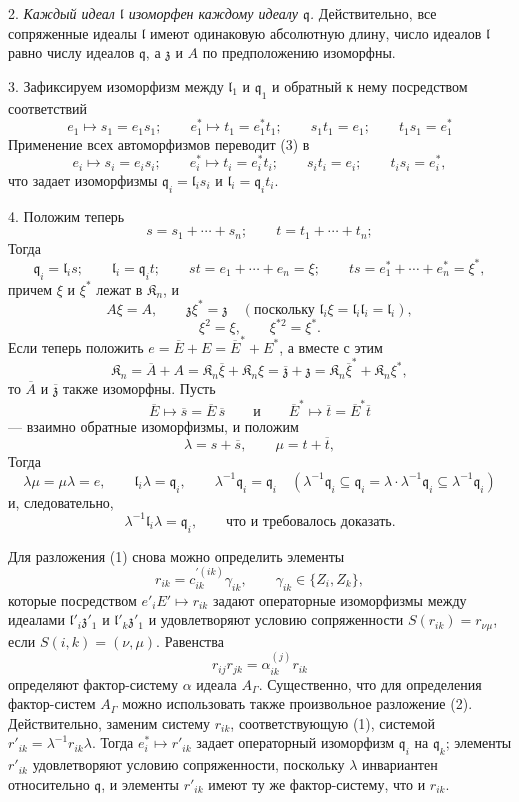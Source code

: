 \documentclass[11pt]{article}
\begin{document}
2. \emph{Каждый идеал \(\mathfrak l\) изоморфен каждому идеалу \(\mathfrak q\).} Действительно, все сопряженные идеалы \(\mathfrak l\) имеют одинаковую абсолютную длину, число идеалов \(\mathfrak l\) равно числу идеалов \(\mathfrak q\), а \(\mathfrak z\) и \(A\) по предположению изоморфны.

3. Зафиксируем изоморфизм между \(\mathfrak l_1\) и \(\mathfrak q_1\) и обратный к нему посредством соответствий
\[
\tag{3}
e_1\mapsto s_1=e_1s_1;\qquad
e_1^*\mapsto t_1=e_1^*t_1;\qquad
s_1t_1=e_1;\qquad
t_1s_1=e_1^*
\]
Применение всех автоморфизмов переводит (3) в
\[
e_i\mapsto s_i=e_is_i;\qquad
e_i^*\mapsto t_i=e_i^*t_i;\qquad
s_it_i=e_i;\qquad
t_is_i=e_i^*,
\]
что задает изоморфизмы \(\mathfrak q_i=\mathfrak l_is_i\) и \(\mathfrak l_i=\mathfrak q_it_i\).

4. Положим теперь
\[
s=s_1+\cdots+s_n;\qquad t=t_1+\cdots+t_n;
\]
Тогда
\[
\mathfrak q_i=\mathfrak l_is;\qquad
\mathfrak l_i=\mathfrak q_it;\qquad
st=e_1+\cdots+e_n=\xi;\qquad
ts=e_1^*+\cdots+e_n^*=\xi^*,
\]
причем \(\xi\) и \(\xi^*\) лежат в \(\mathfrak K_n\), и
\[
A\xi=A,\qquad \mathfrak z\xi^*=\mathfrak z\quad
(\text{поскольку }\mathfrak l_i\xi=\mathfrak l_i\mathfrak l_i=\mathfrak l_i),
\]
\[
\xi^2=\xi,\qquad \xi^{*2}=\xi^*.
\]
Если теперь положить \(e=\overline E+E=\overline E^*+E^*\), а вместе с этим
\[
\mathfrak K_n=\overline A+A
=\mathfrak K_n\overline\xi+\mathfrak K_n\xi
=\overline{\mathfrak z}+\mathfrak z
=\mathfrak K_n\overline\xi^*+\mathfrak K_n\xi^*,
\]
то \(\overline A\) и \(\overline{\mathfrak z}\) также изоморфны. Пусть
\[
\overline E\mapsto\overline s=\overline E\,\overline s
\qquad\text{и}\qquad
\overline E^*\mapsto\overline t=\overline E^*\overline t
\]
--- взаимно обратные изоморфизмы, и положим
\[
\lambda=s+\overline s,\qquad \mu=t+\overline t,
\]
Тогда
\[
\lambda\mu=\mu\lambda=e,\qquad
\mathfrak l_i\lambda=\mathfrak q_i,\qquad
\lambda^{-1}\mathfrak q_i=\mathfrak q_i
\quad
(\lambda^{-1}\mathfrak q_i\subseteq\mathfrak q_i
=\lambda\cdot\lambda^{-1}\mathfrak q_i\subseteq\lambda^{-1}\mathfrak q_i)
\]
и, следовательно,
\[
\lambda^{-1}\mathfrak l_i\lambda=\mathfrak q_i,\qquad \text{что и требовалось доказать.}
\]

Для разложения (1) снова можно определить элементы
\[
r_{ik}=c_{ik}^{\prime(ik)}\gamma_{ik},\qquad \gamma_{ik}\in\{Z_i,Z_k\},
\]
которые посредством \(e'_iE'\mapsto r_{ik}\) задают операторные изоморфизмы между идеалами \(\mathfrak l'_i\mathfrak z'_1\) и \(\mathfrak l'_k\mathfrak z'_1\) и удовлетворяют условию сопряженности \(S(r_{ik})=r_{\nu\mu}\), если \(S(i,k)=(\nu,\mu)\). Равенства
\[
r_{ij}r_{jk}=\alpha_{ik}^{(j)}r_{ik}
\]
определяют фактор-систему \(\alpha\) идеала \(A_\Gamma\). Существенно, что для определения фактор-систем \(A_\Gamma\) можно использовать также произвольное разложение (2). Действительно, заменим систему \(r_{ik}\), соответствующую (1), системой \(r'_{ik}=\lambda^{-1}r_{ik}\lambda\). Тогда \(e_i^*\mapsto r'_{ik}\) задает операторный изоморфизм \(\mathfrak q_i\) на \(\mathfrak q_k\); элементы \(r'_{ik}\) удовлетворяют условию сопряженности, поскольку \(\lambda\) инвариантен относительно \(\mathfrak q\), и элементы \(r'_{ik}\) имеют ту же фактор-систему, что и \(r_{ik}\).
\end{document}
